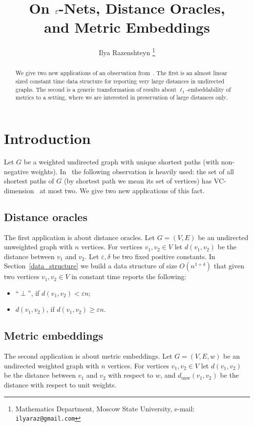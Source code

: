 \documentclass[12pt]{article}
\title{On $\eps$-Nets, Distance Oracles, \\ and Metric Embeddings}
\author{Ilya Razenshteyn \footnote{Mathematics Department, Moscow State University, e-mail: \texttt{ilyaraz@gmail.com}}}
\date{}
\newcommand{\dunw}{d_{\mathrm{unw}}}
\newcommand{\eps}{\varepsilon}
\begin{document}
    \maketitle
    \begin{abstract}
        We give two new applications of an observation from~\cite{ADFGW11}.
        The first is an almost linear sized constant time data structure for reporting very
        large distances in undirected graphs.
        The second is a generic transformation of results about $\ell_1$-embeddability of metrics to a setting,
        where we are interested in preservation of large distances only.
    \end{abstract}
    \section{Introduction}

    Let $G$ be a weighted undirected graph with unique shortest paths (with non-negative weights).
    In~\cite{ADFGW11} the following observation is heavily used: the set of all shortest paths of $G$ (by shortest path we mean its set of vertices)
    has VC-dimension~\cite{VC71} at most two.
    We give two new applications of this fact.

    \subsection{Distance oracles}

    The first application is about distance oracles.
    Let $G = (V, E)$ be an undirected unweighted graph with $n$ vertices.
    For vertices $v_1, v_2 \in V$ let $d(v_1, v_2)$ be the distance between $v_1$ and $v_2$.
    Let $\eps, \delta$ be two fixed positive constants.
    In Section~\ref{data_structure}
    we build a data structure of size $O(n^{1 + \delta})$ that given two vertices $v_1, v_2 \in V$ in constant time reports the following:
    \begin{itemize}
        \item ``$\perp$'', if $d(v_1, v_2) < \eps n$;
        \item $d(v_1, v_2)$, if $d(v_1, v_2) \geq \eps n$.
    \end{itemize}

    \subsection{Metric embeddings}

    The second application is about metric embeddings.
    Let $G = (V, E, w)$ be an undirected weighted graph with $n$ vertices.
    For vertices $v_1, v_2 \in V$ let $d(v_1, v_2)$ be the distance between $v_1$ and $v_2$ with respect to $w$,
    and $\dunw(v_1, v_2)$ be the distance with respect to unit weights.
\end{document}

